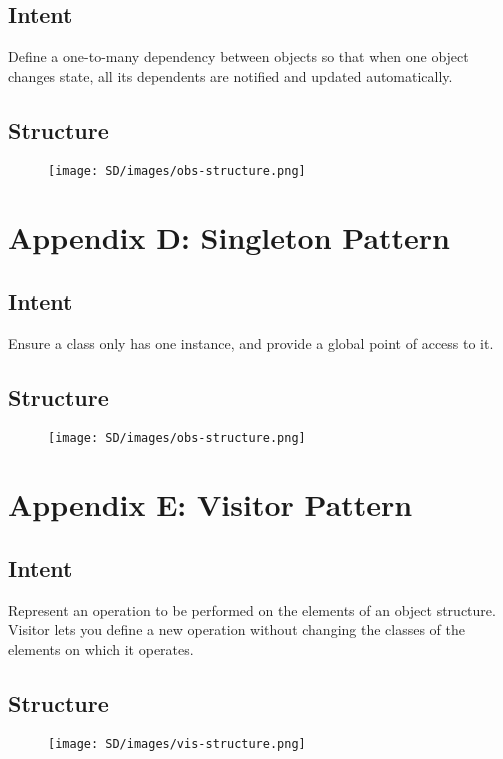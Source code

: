\documentclass{report}
\begin{document}
\subsection{Intent}
Define a one-to-many dependency between objects so that when one object changes state, all its dependents are notified and updated automatically.
\subsection{Structure}
\begin{figure}[htp]
\begin{center}
    \texttt{[image: SD/images/obs-structure.png]}
\end{center}
\end{figure}
\section{Appendix D: Singleton Pattern}\label{Appendix D}
\subsection{Intent}
Ensure a class only has one instance, and provide a global point of access to it.
\subsection{Structure}
\begin{figure}[htp]
\begin{center}
    \texttt{[image: SD/images/obs-structure.png]}
\end{center}
\end{figure}
\section{Appendix E: Visitor Pattern}\label{Appendix E}
\subsection{Intent}
Represent an operation to be performed on the elements of an object structure. Visitor lets you define a new operation without changing the classes of the elements on which it operates.
\subsection{Structure}
\begin{figure}[htp]
\begin{center}
    \texttt{[image: SD/images/vis-structure.png]}
\end{center}
\end{figure}
\end{document}
